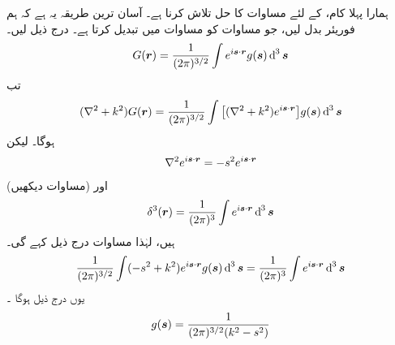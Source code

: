 ہمارا پہلا کام،   کے لئے مساوات   کا حل تلاش کرنا ہے۔ آسان ترین طریقہ یہ ہے کہ ہم فوریئر بدل لیں،  جو   مساوات کو    مساوات میں تبدیل کرتا ہے۔ درج ذیل لیں۔
\begin{align}\label{مساوات_بکھراو_مان_لیں}
	G(\kvec{r})=\frac{1}{(2\pi)^{3/2}}\int e^{i\kvec{s}\cdot \kvec{r}}g(\kvec{s})\dif^{\,3}\kvec{s}
\end{align}
تب 
\begin{align*}
	(\nabla^2+k^2)G(\kvec{r}) = \frac{1}{(2\pi)^{3/2}}\int\big[(\nabla^2+k^2)e^{i\kvec{s}\cdot \kvec{r}}\big]g(\kvec{s})\dif^{\,3}\kvec{s}
\end{align*}
ہوگا۔ لیکن
\begin{align}
	\nabla^2e^{i{{\boldsymbol{s}}}\cdot {\ensuremath{{\boldsymbol{r}}}}} = -s^2 e^{i{{\boldsymbol{s}}}\cdot {\ensuremath{{\boldsymbol{r}}}}}
\end{align}
اور  (مساوات   دیکھیں)
\begin{align}
	\delta^3(\kvec{r})=\frac{1}{(2\pi)^3}\int e^{i\kvec{s}\cdot \kvec{r}}\dif^{\,3}\kvec{s}
\end{align}
ہیں، لہٰذا  مساوات   درج ذیل کہے گی۔
\begin{align*}
	\frac{1}{(2\pi)^{3/2}}\int(-s^2+k^2)e^{i\kvec{s}\cdot \kvec{r}}g(\kvec{s})\dif^{\,3}\kvec{s} = \frac{1}{(2\pi)^3}\int e^{i\kvec{s}\cdot \kvec{r}}\dif^{\,3}\kvec{s}
\end{align*}
یوں درج ذیل ہوگا ۔
\begin{align}
	g({{\boldsymbol{s}}}) = \frac{1}{(2\pi)^{3/2}(k^2-s^2)}
\end{align}

